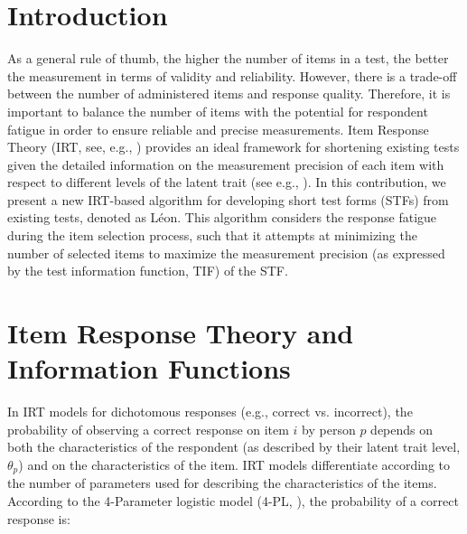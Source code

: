 \documentclass{svproc}
\begin{document}
\section{Introduction}
%
As a general rule of thumb, the higher the number of items in a test, the better the measurement in terms of validity and reliability. However, there is a trade-off between the number of administered items and response quality. Therefore, it is important to balance the number of items with the potential for respondent fatigue in order to ensure reliable and precise measurements. Item Response Theory (IRT, see, e.g., \cite{baker}) provides an ideal framework for shortening existing tests given the detailed information on the measurement precision of each item with respect to different levels of the latent trait (see e.g., \cite{pauci}). 
In this contribution, we present a new IRT-based algorithm for developing short test forms (STFs) from existing tests, denoted as Léon. This algorithm considers the response fatigue during the item selection process, such that it attempts at minimizing the number of selected items to maximize the measurement precision (as expressed by the test information function, TIF) of the STF.

\section{Item Response Theory and Information Functions}  

In IRT models for dichotomous responses (e.g., correct vs. incorrect), the probability of observing a correct response on item $i$ by person $p$ depends on both the characteristics of the respondent (as described by their latent trait level, $\theta_p$) and on the characteristics of the item. IRT models differentiate according to the number of parameters used for describing the characteristics of the items. According to the 4-Parameter logistic model (4-PL, \cite{barton:4pl}), the probability of a correct response is: 
\end{document}
